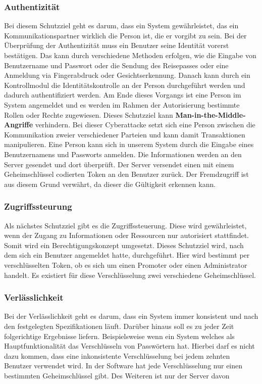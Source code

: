 \subsubsection{Authentizität}
Bei diesem Schutzziel geht es darum, dass ein System gewährleistet, das ein Kommunikationspartner wirklich die Person ist, die er vorgibt zu sein. Bei der Überprüfung der Authentizität muss ein Benutzer seine Identität vorerst bestätigen. Das kann durch verschiedene Methoden erfolgen, wie die Eingabe von Benutzername und Passwort oder die Sendung des Reisepasses oder eine Anmeldung via Fingerabdruck oder Gesichtserkennung. Danach kann durch ein Kontrollmodul die Identitätskontrolle an der Person durchgeführt werden und dadurch authentifiziert werden. Am Ende dieses Vorgangs ist eine Person im System angemeldet und es werden im Rahmen der Autorisierung bestimmte Rollen oder Rechte zugewiesen.
Dieses Schutzziel kann \textbf{Man-in-the-Middle-Angriffe} verhindern. Bei dieser Cyberattacke setzt sich eine Person zwischen die Kommunikation zweier verschiedener Parteien und kann damit Transaktionen manipulieren. 
Eine Person kann sich in unserem System durch die Eingabe eines Benutzernamens und Passworts anmelden. Die Informationen werden an den Server gesendet und dort überprüft. Der Server versendet einen mit einem Geheimschlüssel codierten Token an den Benutzer zurück. Der Fremdzugriff ist aus diesem Grund verwährt, da dieser die Gültigkeit erkennen kann.

\subsubsection{Zugriffssteurung}
Als nächstes Schutzziel gibt es die Zugriffssteuerung. Diese wird gewährleistet, wenn der Zugang zu Informationen oder Ressourcen nur autorisiert stattfindet. Somit wird ein Berechtigungskonzept umgesetzt. 
Dieses Schutzziel wird, nach dem sich ein Benutzer angemeldet hatte, durchgeführt. Hier wird bestimmt per verschlüsselten Token, ob es sich um einen Promoter oder einen Administrator handelt. Es existiert für diese Verschlüsselung zwei verschiedene Geheimschlüssel.

\subsubsection{Verlässlichkeit}
Bei der Verlässlichkeit geht es darum, dass ein System immer konsistent und nach den festgelegten Spezifikationen läuft. Darüber hinaus soll es zu jeder Zeit folgerichtige Ergebnisse liefern. Beispielsweise wenn ein System welches als Hauptfunktionalität das Verschlüsseln von Passwörtern hat. Hierbei darf es nicht dazu kommen, dass eine inkonsistente Verschlüsselung bei jedem zehnten Benutzer verwendet wird.
In der Software hat jede Verschlüsselung nur einen bestimmten Geheimschlüssel gibt. Des Weiteren ist nur der Server davon 

